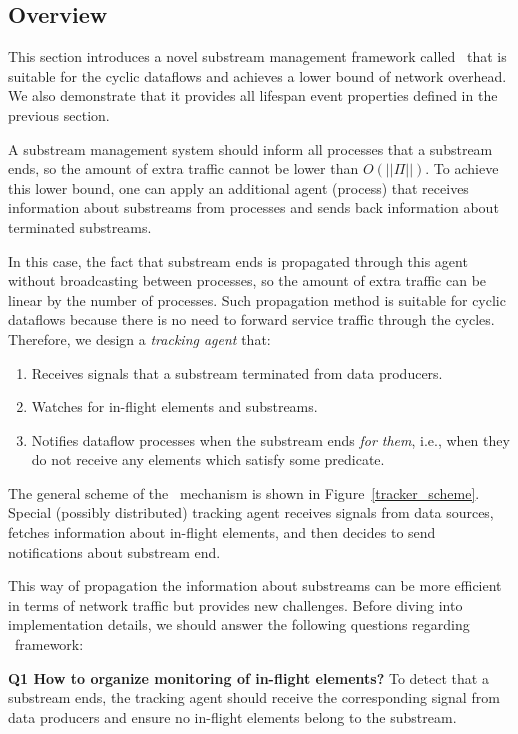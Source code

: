 \label{fs-acker-tracker}

\subsection{Overview}

This section introduces a novel substream management framework called \tracker\ that is suitable for the cyclic dataflows and achieves a lower bound of network overhead. We also demonstrate that it provides all lifespan event properties defined in the previous section.

A substream management system should inform all processes that a substream ends, so the amount of extra traffic cannot be lower than $O(||\Pi||)$. To achieve this lower bound, one can apply an additional agent (process) that receives information about substreams from processes and sends back information about terminated substreams. 

In this case, the fact that substream ends is propagated through this agent without broadcasting between processes, so the amount of extra traffic can be linear by the number of processes. Such propagation method is suitable for cyclic dataflows because there is no need to forward service traffic through the cycles. Therefore, we design a {\em tracking agent} that:

\begin{enumerate}
    \item Receives signals that a substream terminated from data producers.
    \item Watches for in-flight elements and substreams.
    \item Notifies dataflow processes when the substream ends {\em for them}, i.e., when they do not receive any elements which satisfy some predicate.
\end{enumerate}

The general scheme of the \tracker\ mechanism is shown in Figure~\ref{tracker_scheme}. Special (possibly distributed) tracking agent receives signals from data sources, fetches information about in-flight elements, and then decides to send notifications about substream end. 

This way of propagation the information about substreams can be more efficient in terms of network traffic but provides new challenges. Before diving into implementation details, we should answer the following questions regarding \tracker\ framework:

{\bf Q1 How to organize monitoring of in-flight elements?} To detect that a substream ends, the tracking agent should receive the corresponding signal from data producers and ensure no in-flight elements belong to the substream. 

